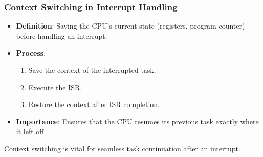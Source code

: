 \begin{frame}
    \frametitle{Context Switching in Interrupt Handling}

    \begin{itemize}
        \item \textbf{Definition}: Saving the CPU's current state (registers, program counter) before handling an interrupt.
        \item \textbf{Process}:
            \begin{enumerate}
                \item Save the context of the interrupted task.
                \item Execute the ISR.
                \item Restore the context after ISR completion.
            \end{enumerate}
        \item \textbf{Importance}: Ensures that the CPU resumes its previous task exactly where it left off.
    \end{itemize}

    \bigskip
    Context switching is vital for seamless task continuation after an interrupt.
\end{frame}